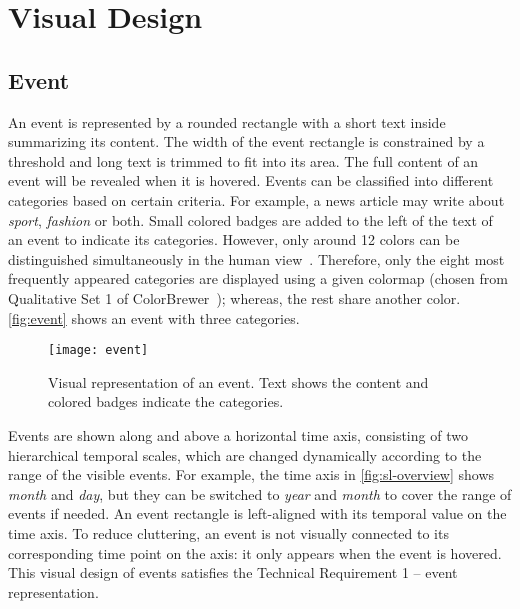 \section{Visual Design}

\subsection{Event}
An event is represented by a rounded rectangle with a short text inside summarizing its content. The width of the event rectangle is constrained by a threshold and long text is trimmed to fit into its area. The full content of an event will be revealed when it is hovered. Events can be classified into different categories based on certain criteria. For example, a news article may write about \emph{sport}, \emph{fashion} or both. Small colored badges are added to the left of the text of an event to indicate its categories. However, only around 12 colors can be distinguished simultaneously in the human view~\cite{Munzner2014}. Therefore, only the eight most frequently appeared categories are displayed using a given colormap (chosen from Qualitative Set 1 of  ColorBrewer~\cite{Harrower2003}); whereas, the rest share another color. \autoref{fig:event} shows an event with three categories.

\begin{figure}[!htb]
\centering
\texttt{[image: event]}
\caption[Visual representation of an event]{Visual representation of an event. Text shows the content and colored badges indicate the categories.}
\label{fig:event}
\end{figure}

Events are shown along and above a horizontal time axis, consisting of two hierarchical temporal scales, which are changed dynamically according to the range of the visible events. For example, the time axis in \autoref{fig:sl-overview} shows \emph{month} and \emph{day}, but they can be switched to \emph{year} and \emph{month} to cover the range of events if needed. An event rectangle is left-aligned with its temporal value on the time axis. To reduce cluttering, an event is not visually connected to its corresponding time point on the axis: it only appears when the event is hovered. This visual design of events satisfies the Technical Requirement 1 -- event representation.

